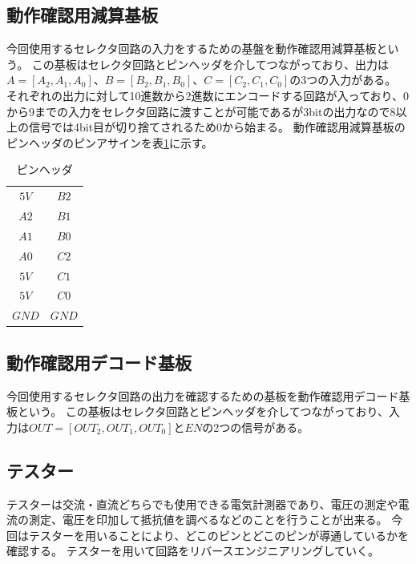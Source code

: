 \documentclass[a4paper,11pt]{ltjsarticle}
\begin{document}
\subsection{動作確認用減算基板}
今回使用するセレクタ回路の入力をするための基盤を動作確認用減算基板という。
この基板はセレクタ回路とピンヘッダを介してつながっており、出力は$A= [A_2, A_1, A_0]$、$B = [B_2, B_1, B_0]$、$C = [C_2, C_1, C_0]$の3つの入力がある。
それぞれの出力に対して10進数から2進数にエンコードする回路が入っており、0から9までの入力をセレクタ回路に渡すことが可能であるが3bitの出力なので8以上の信号では4bit目が切り捨てされるため0から始まる。
動作確認用減算基板のピンヘッダのピンアサインを表\ref{tab:pin}に示す。
\begin{table}[htbp]
  \centering
  \caption{ピンヘッダ}
  \label{tab:pin}
  \begin{tabular}{|cc|}
    \hline
    $5V$ & $B2$ \\
    $A2$ & $B1$ \\
    $A1$ & $B0$ \\
    $A0$ & $C2$ \\
    $5V$ & $C1$ \\
    $5V$ & $C0$ \\
    $GND$ & $GND$ \\
    \hline
  \end{tabular}
\end{table}
\subsection{動作確認用デコード基板}
今回使用するセレクタ回路の出力を確認するための基板を動作確認用デコード基板という。
この基板はセレクタ回路とピンヘッダを介してつながっており、入力は$OUT = [OUT_2,OUT_1,OUT_0]$と$EN$の2つの信号がある。
\subsection{テスター}
テスターは交流・直流どちらでも使用できる電気計測器であり、電圧の測定や電流の測定、電圧を印加して抵抗値を調べるなどのことを行うことが出来る。
今回はテスターを用いることにより、どこのピンとどこのピンが導通しているかを確認する。
テスターを用いて回路をリバースエンジニアリングしていく。
\end{document}

